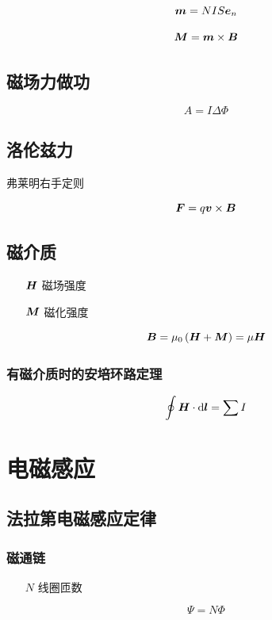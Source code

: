 \documentclass{article}
\begin{document}
\[\boldsymbol{m}=NIS\boldsymbol{e}_n\]

\[\boldsymbol{M}=\boldsymbol{m}\times\boldsymbol{B}\]

\subsection{磁场力做功}

\[A=I\Delta\Phi\]

\subsection{洛伦兹力}

弗莱明右手定则

\[\boldsymbol{F}=q\boldsymbol{v}\times\boldsymbol{B}\]

\subsection{磁介质}

\begin{enumerate}
    \item [$\boldsymbol{H}$] 磁场强度
    \item [$\boldsymbol{M}$] 磁化强度
\end{enumerate}

\[\boldsymbol{B}=\mu_0\left(\boldsymbol{H}+\boldsymbol{M}\right)=\mu\boldsymbol{H}\]

\subsubsection{有磁介质时的安培环路定理}

\[\oint\boldsymbol{H}\cdot\mathrm d\boldsymbol{l}=\sum I\]

\section{电磁感应}

\subsection{法拉第电磁感应定律}

\subsubsection{磁通链}

\begin{enumerate}
    \item [$N$] 线圈匝数
\end{enumerate}

\[\Psi=N\Phi\]
\end{document}
